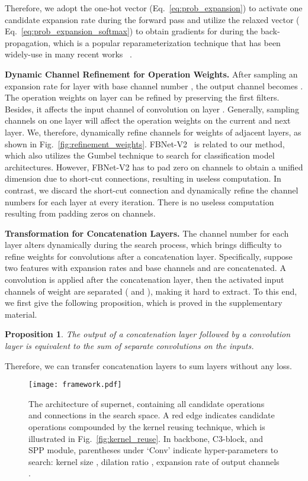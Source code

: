 \documentclass[letterpaper]{article} \usepackage{aaai22}  \usepackage{times}  \usepackage{helvet}  \usepackage{courier}  \usepackage[hyphens]{url}  \usepackage{graphicx} \urlstyle{rm} \def\UrlFont{\rm}  \usepackage{natbib}  \usepackage{caption} \DeclareCaptionStyle{ruled}{labelfont=normalfont,labelsep=colon,strut=off} \frenchspacing  \setlength{\pdfpagewidth}{8.5in}  \setlength{\pdfpageheight}{11in}
\newtheorem{MyProp}{Proposition}
\begin{document}
Therefore, we adopt the one-hot vector  (Eq.~\ref{eq:prob_expansion}) to activate one candidate expansion rate during the forward pass and utilize the relaxed vector  ( Eq.~\ref{eq:prob_expansion_softmax}) to obtain gradients for  during the back-propagation, which is a popular reparameterization technique that has been widely-use in many recent works ~\cite{dong2019searching,fbnetv2}.

\textbf{Dynamic Channel Refinement for Operation Weights.}
After sampling an expansion rate  for layer  with base channel number , the output channel becomes . The operation weights on layer  can be refined by preserving the first  filters. Besides, it affects the input channel of convolution on layer . Generally, sampling channels on one layer will affect the operation weights on the current and next layer. We, therefore, dynamically refine channels for weights of adjacent layers, as shown in Fig.~\ref{fig:refinement_weights}.
FBNet-V2~\cite{fbnetv2} is related to our method, which also utilizes the Gumbel technique to search for classification model architectures. However, FBNet-V2 has to pad zero on channels to obtain a unified dimension due to short-cut connections, resulting in useless computation. In contrast, we discard the short-cut connection and dynamically refine the channel numbers for each layer at every iteration. There is no useless computation resulting from padding zeros on channels.


\textbf{Transformation for Concatenation Layers.}
The channel number for each layer alters dynamically during the search process, which brings difficulty to refine weights for convolutions after a concatenation layer. Specifically, suppose two features with expansion rates and base channels  and  are concatenated. A convolution is applied after the concatenation layer, then the activated input channels of weight are separated ( and ), making it hard to extract. 
To this end, we first give the following proposition, which is proved in the supplementary material.
\begin{MyProp}
The output of a concatenation layer followed by a convolution layer is equivalent to the sum of separate convolutions on the inputs.
\label{prop:concat_sum}
\end{MyProp}
Therefore, we can transfer concatenation layers to sum layers without any loss.




\begin{figure*}[tb!]
\centering
\texttt{[image: framework.pdf]}
\vspace{-15pt}
\caption{The architecture of supernet, containing all candidate operations and connections in the search space. A red edge indicates candidate operations compounded by the kernel reusing technique, which is illustrated in Fig.~\ref{fig:kernel_reuse}. In backbone, C3-block, and SPP module, parentheses under `Conv' indicate hyper-parameters to search:   kernel size , dilation ratio , expansion rate of output channels . }
\label{fig:framework}
\end{figure*}
\end{document}
